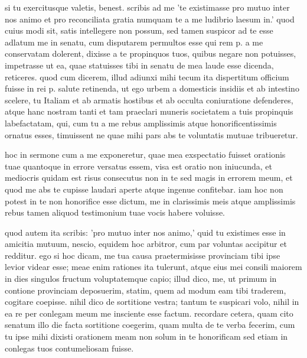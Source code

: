 


 si tu exercitusque valetis, benest. scribis ad me 'te existimasse pro mutuo inter nos animo et pro reconciliata gratia numquam te a me ludibrio laesum in.' quod cuius modi sit, satis intellegere non possum, sed tamen suspicor ad te esse adlatum me in senatu, cum disputarem permultos esse qui rem p. a me conservatam dolerent, dixisse a te propinquos tuos, quibus negare non potuisses, impetrasse ut ea, quae statuisses tibi in senatu de mea laude esse dicenda, reticeres. quod cum dicerem, illud adiunxi mihi tecum ita dispertitum officium fuisse in rei p. salute retinenda, ut ego urbem a domesticis insidiis et ab intestino scelere, tu Italiam et ab armatis hostibus et ab occulta coniuratione defenderes, atque hanc nostram tanti et tam praeclari muneris societatem a tuis propinquis labefactatam, qui, cum tu a me rebus amplissimis atque honorificentissimis ornatus esses, timuissent ne quae mihi pars abs te voluntatis mutuae tribueretur.

 hoc in sermone cum a me exponeretur, quae mea exspectatio fuisset orationis tuae quantoque in errore versatus essem, visa est oratio non iniucunda, et mediocris quidam est risus consecutus non in te sed magis in errorem meum, et quod me abs te cupisse laudari aperte atque ingenue confitebar. iam hoc non potest in te non honorifice esse dictum, me in clarissimis meis atque amplissimis rebus tamen aliquod testimonium tuae vocis habere voluisse.

 quod autem ita scribis: 'pro mutuo inter nos animo,' quid tu existimes esse in amicitia mutuum, nescio, equidem hoc arbitror, cum par voluntas accipitur et redditur. ego si hoc dicam, me tua causa praetermisisse provinciam tibi ipse levior videar esse; meae enim rationes ita tulerunt, atque eius mei consili maiorem in dies singulos fructum voluptatemque capio; illud dico, me, ut primum in contione provinciam deposuerim, statim, quem ad modum eam tibi traderem, cogitare coepisse. nihil dico de sortitione vestra; tantum te suspicari volo, nihil in ea re per conlegam meum me insciente esse factum. recordare cetera, quam cito senatum illo die facta sortitione coegerim, quam multa de te verba fecerim, cum tu ipse mihi dixisti orationem meam non solum in te honorificam sed etiam in conlegas tuos contumeliosam fuisse.

